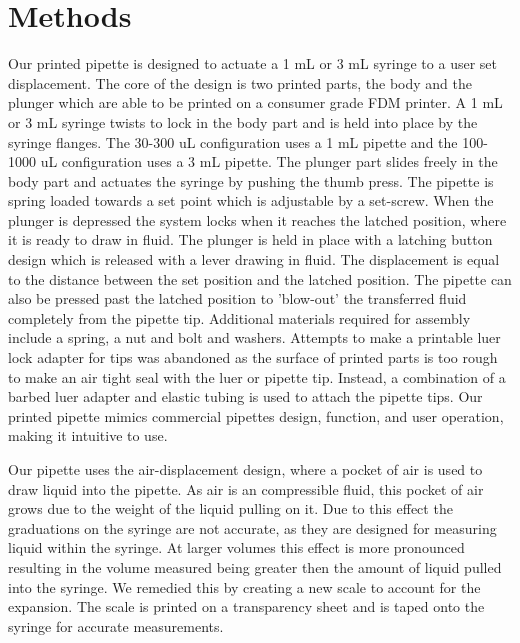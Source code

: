 \documentclass[10pt,letterpaper]{article}
\begin{document}
\section*{Methods}
Our printed pipette is designed to actuate a 1 mL or 3 mL syringe to a user set displacement.
The core of the design is two printed parts, the body and the plunger which are able to be printed on a consumer grade FDM printer.
A 1 mL or 3 mL syringe twists to lock in the body part and is held into place by the syringe flanges.
The 30-300 uL configuration uses a 1 mL pipette and the 100-1000 uL configuration uses a 3 mL pipette.
The plunger part slides freely in the body part and actuates the syringe by pushing the thumb press. 
The pipette is spring loaded towards a set point which is adjustable by a set-screw. 
When the plunger is depressed the system locks when it reaches the latched position, where it is ready to draw in fluid.
The plunger is held in place with a latching button design which is released with a lever drawing in fluid.
The displacement is equal to the distance between the set position and the latched position.
The pipette can also be pressed past the latched position to 'blow-out' the transferred fluid completely from the pipette tip.   
Additional materials required for assembly include a spring, a nut and bolt and washers.
Attempts to make a printable luer lock adapter for tips was abandoned as the surface of printed parts is too rough to make an air tight seal with the luer or pipette tip.
Instead, a combination of a barbed luer adapter and elastic tubing is used to attach the pipette tips.
Our printed pipette mimics commercial pipettes design, function, and user operation, making it intuitive to use.

Our pipette uses the air-displacement design, where a pocket of air is used to draw liquid into the pipette.
As air is an compressible fluid, this pocket of air grows due to the weight of the liquid pulling on it.
Due to this effect the graduations on the syringe are not accurate, as they are designed for measuring liquid within the syringe.
At larger volumes this effect is more pronounced resulting in the volume measured being greater then the amount of liquid pulled into the syringe.
We remedied this by creating a new scale to account for the expansion.
The scale is printed on a transparency sheet and is taped onto the syringe for accurate measurements. 
\end{document}
